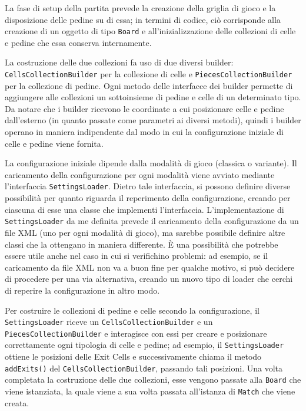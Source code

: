 \documentclass[a4paper,12pt]{report}
\begin{document}
La fase di setup della partita prevede la creazione della griglia di gioco e la disposizione delle pedine su di essa; in termini di codice, ciò corrisponde alla creazione di un oggetto di tipo \texttt{Board} e all'inizializzazione delle collezioni di celle e pedine che essa conserva internamente. 

La costruzione delle due collezioni fa uso di due diversi builder: \\ \texttt{CellsCollectionBuilder} per la collezione di celle e \texttt{PiecesCollectionBuilder} per la collezione di pedine. Ogni metodo delle interfacce dei builder permette di aggiungere alle collezioni un sottoinsieme di pedine e celle di un determinato tipo. Da notare che i builder ricevono le coordinate a cui posizionare celle e pedine dall'esterno (in quanto passate come parametri ai diversi metodi), quindi i builder operano in maniera indipendente dal modo in cui la configurazione iniziale di celle e pedine viene fornita.

La configurazione iniziale dipende dalla modalità di gioco (classica o variante). Il caricamento della configurazione per ogni modalità viene avviato mediante l'interfaccia \texttt{SettingsLoader}. Dietro tale interfaccia, si possono definire diverse possibilità per quanto riguarda il reperimento della configurazione, creando per ciascuna di esse una classe che implementi l'interfaccia. L'implementazione di \texttt{SettingsLoader} da me definita prevede il caricamento della configurazione da un file XML (uno per ogni modalità di gioco), ma sarebbe possibile definire altre classi che la ottengano in maniera differente. È una possibilità che potrebbe essere utile anche nel caso in cui si verifichino problemi: ad esempio, se il caricamento da file XML non va a buon fine per qualche motivo, si può decidere di procedere per una via alternativa, creando un nuovo tipo di loader che cerchi di reperire la configurazione in altro modo.

Per costruire le collezioni di pedine e celle secondo la configurazione, il \texttt{SettingsLoader} riceve un \texttt{CellsCollectionBuilder} e un \\ \texttt{PiecesCollectionBuilder} e interagisce con essi per creare e posizionare correttamente ogni tipologia di celle e pedine; ad esempio, il \texttt{SettingsLoader} ottiene le posizioni delle Exit Cells e successivamente chiama il metodo \texttt{addExits()} del \texttt{CellsCollectionBuilder}, passando tali posizioni. Una volta completata la costruzione delle due collezioni, esse vengono passate alla \texttt{Board} che viene istanziata, la quale viene a sua volta passata all'istanza di \texttt{Match} che viene creata.
\end{document}

